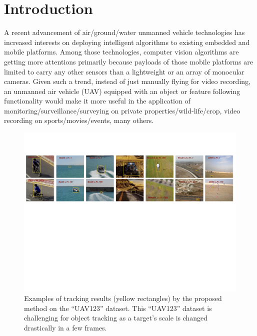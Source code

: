 \documentclass[10pt,twocolumn,letterpaper]{article}
\begin{document}
\section{Introduction}
A recent advancement of air/ground/water unmanned vehicle technologies
has increased interests on deploying intelligent algorithms to
existing embedded and mobile platforms. Among those technologies,
computer vision algorithms are getting more attentions primarily
because payloads of those mobile platforms are limited to carry any
other sensors than a lightweight or an array of monocular
cameras. Given such a trend, instead of just manually flying for video
recording, an unmanned air vehicle (UAV) equipped with an object or
feature following functionality would make it more useful in the
application of monitoring/surveillance/surveying on private
properties/wild-life/crop, video recording on sports/movies/events,
many others.

\begin{figure}[!h]
\centering
\includegraphics[width=\textwidth]{./figures/ResultsIntroduction.pdf}
\caption{Examples of tracking results (yellow rectangles) by the
  proposed method on the ``UAV123'' dataset. This ``UAV123'' dataset
  is challenging for object tracking as a target's scale is changed
  drastically in a few frames.}
\label{ResultsIntroduction}
\end{figure}
\end{document}
